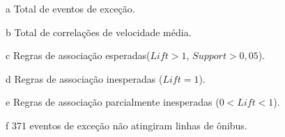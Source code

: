 \documentclass[
	12pt,				%
	oneside,			%
	a4paper,			%
	english,			%
	brazil				%
	]{abntex2ppgsi}
\begin{document}
{{{\begin{apendicesenv}
\begin{table}[!htb]
\begin{threeparttable}
\begin{tablenotes}
            \item[a] Total de eventos de exceção.
            \item[b] Total de correlações de velocidade média.
            \item[c] Regras de associação esperadas($Lift > 1$, $Support > 0,05$).
            \item[d] Regras de associação inesperadas ($Lift = 1$).
            \item[e] Regras de associação parcialmente inesperadas ($0 < Lift < 1$).
            \item[f] 371 eventos de exceção não atingiram linhas de ônibus.
        \end{tablenotes}
\end{threeparttable}
\end{table}


\end{apendicesenv}}}}
\end{document}
